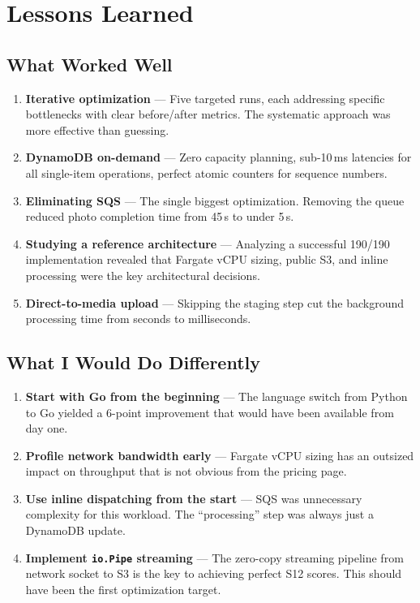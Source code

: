 \documentclass[11pt]{article}
\begin{document}
\section{Lessons Learned}

\subsection{What Worked Well}

\begin{enumerate}
    \item \textbf{Iterative optimization} --- Five targeted runs, each addressing specific bottlenecks with clear before/after metrics. The systematic approach was more effective than guessing.
    \item \textbf{DynamoDB on-demand} --- Zero capacity planning, sub-10\,ms latencies for all single-item operations, perfect atomic counters for sequence numbers.
    \item \textbf{Eliminating SQS} --- The single biggest optimization. Removing the queue reduced photo completion time from 45\,s to under 5\,s.
    \item \textbf{Studying a reference architecture} --- Analyzing a successful 190/190 implementation revealed that Fargate vCPU sizing, public S3, and inline processing were the key architectural decisions.
    \item \textbf{Direct-to-media upload} --- Skipping the staging step cut the background processing time from seconds to milliseconds.
\end{enumerate}

\subsection{What I Would Do Differently}

\begin{enumerate}
    \item \textbf{Start with Go from the beginning} --- The language switch from Python to Go yielded a 6-point improvement that would have been available from day one.
    \item \textbf{Profile network bandwidth early} --- Fargate vCPU sizing has an outsized impact on throughput that is not obvious from the pricing page.
    \item \textbf{Use inline dispatching from the start} --- SQS was unnecessary complexity for this workload. The ``processing'' step was always just a DynamoDB update.
    \item \textbf{Implement \texttt{io.Pipe} streaming} --- The zero-copy streaming pipeline from network socket to S3 is the key to achieving perfect S12 scores. This should have been the first optimization target.
\end{enumerate}
\end{document}
